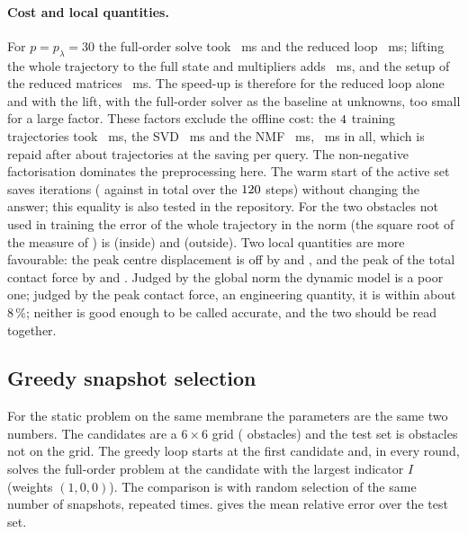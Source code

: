 \paragraph{Cost and local quantities.} For $p=p_\lambda=30$ the full-order solve took \chdTimeFom~ms and the reduced loop \chdTimeRom~ms; lifting the whole trajectory to the full state and multipliers adds \chdTimeLift~ms, and the setup of the reduced matrices \chdTimeSetup~ms. The speed-up is therefore \chdSpeed{} for the reduced loop alone and \chdSpeedLift{} with the lift, with the full-order solver as the baseline at \chdN{} unknowns, too small for a large factor. These factors exclude the offline cost: the $4$ training trajectories took \chdTimeTrajs~ms, the SVD \chdTimeSvd~ms and the NMF \chdTimeNmf~ms, \chdTimeOffline~ms in all, which is repaid after about \chdBreakEven{} trajectories at the saving per query. The non-negative factorisation dominates the preprocessing here. The warm start of the active set saves iterations (\chdItersWarm{} against \chdItersCold{} in total over the $120$ steps) without changing the answer; this equality is also tested in the repository. For the two obstacles not used in training the error of the whole trajectory in the norm (the square root of the measure of ) is \chdGlobalIn{} (inside) and \chdGlobalOut{} (outside). Two local quantities are more favourable: the peak centre displacement is off by \chdPeakDispIn{} and \chdPeakDispOut, and the peak of the total contact force by \chdPeakForceIn{} and \chdPeakForceOut. Judged by the global norm the dynamic model is a poor one; judged by the peak contact force, an engineering quantity, it is within about $8\,\%$; neither is good enough to be called accurate, and the two should be read together.

\subsection{Greedy snapshot selection}

For the static problem on the same membrane the parameters are the same two numbers. The candidates are a $6\times6$ grid (\cgrNCand{} obstacles) and the test set is \cgrNTest{} obstacles not on the grid. The greedy loop starts at the first candidate and, in every round, solves the full-order problem at the candidate with the largest indicator $I$ (weights $(1,0,0)$). The comparison is with random selection of the same number of snapshots, repeated \cgrNRand{} times.  gives the mean relative error over the test set.

